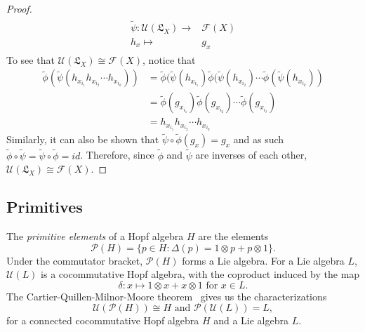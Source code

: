 \documentclass[11pt]{amsart}
\theoremstyle{definition}
\numberwithin{equation}{section}
\begin{document}
\begin{proof}
    \begin{align*}
        \begin{array}{rcl}
            \tilde{\psi}: \mathcal{U}(\mathfrak{L}_{X}) \longrightarrow & \mathcal{F} (X) \\
            h_x \longmapsto & g_x
        \end{array}
    \end{align*}
    To see that \(\mathcal{U}(\mathfrak{L}_{X}) \cong \mathcal{F}(X)\), notice that
    \begin{align*}
        \tilde{\phi}(\tilde{\psi}(h_{x_{i_{1}} }h_{x_{i_{2}}} \cdots h_{x_{i_{k}}}))  
        &= \tilde{\phi}(\tilde{\psi}(h_{x_{i_{1}} })\tilde{\phi}(\tilde{\psi}(h_{x_{i_{2}} } )\cdots \tilde{\phi}(\tilde{\psi}(h_{x_{i_{k}} })) \\
        &=  \tilde{\phi}(g_{x_{i_{1}} })\tilde{\phi}(g_{x_{i_{2}} })\cdots \tilde{\phi}(g_{x_{i_{\ell}} })\\
        &= h_{x_{i_{1}} }h_{x_{i_{2}} } \cdots h_{x_{i_{k}} }
    \end{align*} 
    Similarly, it can also be shown that \(\tilde{\psi} \circ \tilde{\phi} (g_x) = g_x\) and as such \(\tilde{\phi} \circ \tilde{\psi} = \tilde{\psi} \circ \tilde{\phi} = id\).
    Therefore, since \(\tilde{\phi}\) and \(\tilde{\psi}\) are inverses of each other,  \(\mathcal{U}(\mathfrak{L}_{X}) \cong \mathcal{F}(X)\).
\end{proof}

%

\subsection{Primitives}

The \textit{primitive elements} of a Hopf algebra $H$ are the elements 
\[
\mathcal{P}(H)=\{p\in H:\Delta (p)=1\otimes p + p\otimes 1\}.
\]
Under the commutator bracket, $\mathcal{P}(H)$ forms a Lie algebra. For a Lie algebra $L$, $\mathcal{U}(L)$ is a cocommutative Hopf algebra, with the coproduct induced by the map 
\[
\delta:x\mapsto 1\otimes x + x\otimes 1 \text{ for } x\in L.
\] 
The Cartier-Quillen-Milnor-Moore theorem~\cite[see Theorem 5.18]{MM65} gives us the characterizations
\[
\mathcal{U}(\mathcal{P}(H))\cong H \text{ and } \mathcal{P}(\mathcal{U}(L))=L,
\]
for a connected cocommutative Hopf algebra $H$ and a Lie algebra $L$.
\end{document}
